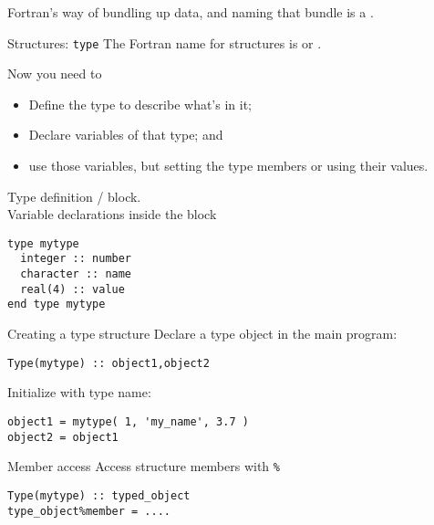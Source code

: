 
Fortran's way of bundling up data, and naming that bundle is a
.

\begin{slide}{Structures: \noexpand\texttt{type}}
  \label{sl:ftype}
  The Fortran name for structures is  or
  .
\end{slide}

Now you need to
\begin{itemize}
\item Define the type to describe what's in it;
\item Declare variables of that type; and
\item use those variables, but setting the type members or using their
  values.
\end{itemize}

\begin{block}{Type definition}
  \label{sl:ftype-def}
   /  block.\\
  Variable declarations inside the block
\begin{verbatim}
type mytype
  integer :: number
  character :: name
  real(4) :: value
end type mytype
\end{verbatim}
\end{block}

\begin{block}{Creating a type structure}
  \label{sl:ftype-set}
  Declare a type object in the main program:
\begin{verbatim}
Type(mytype) :: object1,object2
\end{verbatim}
 Initialize with type name:
\begin{verbatim}
object1 = mytype( 1, 'my_name', 3.7 )
object2 = object1
\end{verbatim}
\end{block}

\begin{block}{Member access}
  \label{sl:ftype-access}
  Access structure members with \verb+%+
\begin{verbatim}
Type(mytype) :: typed_object
type_object%member = ....  
\end{verbatim}
\end{block}

